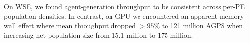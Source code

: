 
On WSE, we found agent-generation throughput to be consistent across per-PE population densities.
In contrast, on GPU we encountered an apparent memory-wall effect where mean throughput dropped $>95\%$ to 121 million AGPS when increasing net population size from 15.1 million to 175 million.






